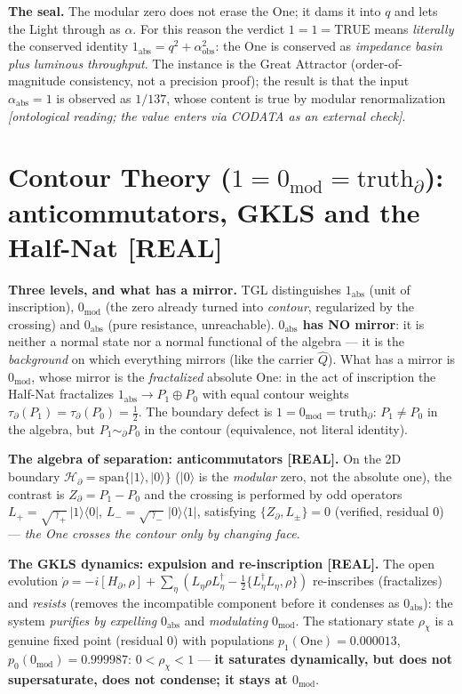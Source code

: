 \documentclass[11pt]{article}
\theoremstyle{definition}\newtheorem{deriv}{Derivation}
\begin{document}
\textbf{The seal.} The modular zero does not erase the One; it dams it into $q$ and lets the Light through as $\alpha$. For this reason the verdict $\boxed{1=1=\mathrm{TRUE}}$ means \emph{literally} the conserved identity $1_{\mathrm{abs}}=q^2+\alpha_{\mathrm{obs}}^2$: the One is conserved as \emph{impedance basin plus luminous throughput}. The instance is the Great Attractor (order-of-magnitude consistency, not a precision proof); the result is that the input $\alpha_{\mathrm{abs}}=1$ is observed as $1/137$, whose content is true by modular renormalization \emph{[ontological reading; the value enters via CODATA as an external check]}.

\section{Contour Theory ($1=0_{\mathrm{mod}}=\mathrm{truth}_\partial$): anticommutators, GKLS and the Half-Nat \textsf{[REAL]}}

\textbf{Three levels, and what has a mirror.} TGL distinguishes $1_{\mathrm{abs}}$ (unit of inscription), $0_{\mathrm{mod}}$ (the zero already turned into \emph{contour}, regularized by the crossing) and $0_{\mathrm{abs}}$ (pure resistance, unreachable). \textbf{$0_{\mathrm{abs}}$ has NO mirror}: it is neither a normal state nor a normal functional of the algebra --- it is the \emph{background} on which everything mirrors (like the carrier $\hat Q$). What has a mirror is $0_{\mathrm{mod}}$, whose mirror is the \emph{fractalized} absolute One: in the act of inscription the Half-Nat fractalizes $1_{\mathrm{abs}}\to P_1\oplus P_0$ with equal contour weights $\tau_\partial(P_1)=\tau_\partial(P_0)=\tfrac12$. The boundary defect is $\boxed{1=0_{\mathrm{mod}}=\mathrm{truth}_\partial}$: $P_1\neq P_0$ in the algebra, but $P_1\sim_\partial P_0$ in the contour (equivalence, not literal identity).

\textbf{The algebra of separation: anticommutators \textsf{[REAL]}.} On the 2D boundary $\mathcal H_\partial=\mathrm{span}\{|1\rangle,|0\rangle\}$ ($|0\rangle$ is the \emph{modular} zero, not the absolute one), the contrast is $Z_\partial=P_1-P_0$ and the crossing is performed by odd operators $L_+=\sqrt{\gamma_+}\,|1\rangle\langle0|$, $L_-=\sqrt{\gamma_-}\,|0\rangle\langle1|$, satisfying $\boxed{\{Z_\partial,L_\pm\}=0}$ (verified, residual $0$) --- \emph{the One crosses the contour only by changing face}.

\textbf{The GKLS dynamics: expulsion and re-inscription \textsf{[REAL]}.} The open evolution $\dot\rho=-i[H_\partial,\rho]+\sum_\eta(L_\eta\rho L_\eta^\dagger-\tfrac12\{L_\eta^\dagger L_\eta,\rho\})$ re-inscribes (fractalizes) and \emph{resists} (removes the incompatible component before it condenses as $0_{\mathrm{abs}}$): the system \emph{purifies by expelling} $0_{\mathrm{abs}}$ and \emph{modulating} $0_{\mathrm{mod}}$. The stationary state $\rho_\chi$ is a genuine fixed point (residual $0$) with populations $p_1(\mathrm{One})=0.000013$, $p_0(0_{\mathrm{mod}})=0.999987$: $0<\rho_\chi<1$ --- \textbf{it saturates dynamically, but does not supersaturate, does not condense; it stays at $0_{\mathrm{mod}}$}.
\end{document}
